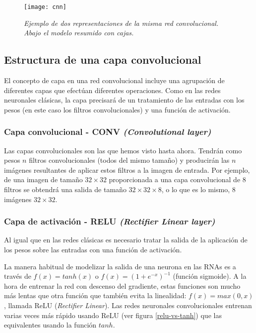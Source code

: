 \begin{figure}
    \centering
    \caption{\textit{Ejemplo de dos representaciones de la misma red convolucional. Abajo el modelo resumido con cajas.}}
  \label{cnn_basic}
  \texttt{[image: cnn]}
\end{figure}


\subsection{Estructura de una capa convolucional}

El concepto de capa en una red convolucional incluye una agrupación de diferentes capas que efectúan diferentes operaciones. Como en las redes neuronales clásicas, la capa precisará de un tratamiento de las entradas con los pesos (en este caso los filtros convolucionales) y una función de activación.

\subsubsection{Capa convolucional - CONV \textit{(Convolutional layer)}}

Las capas convolucionales son las que hemos visto hasta ahora. Tendrán como pesos $n$ filtros convolucionales (todos del mismo tamaño) y producirán las $n$ imágenes resultantes de aplicar estos filtros a la imagen de entrada. Por ejemplo, de una imagen de tamaño $32\times 32$ proporcionada a una capa convolucional de 8 filtros se obtendrá una salida de tamaño $32 \times 32 \times 8$, o lo que es lo mismo, 8 imágenes $32 \times 32$.

\subsubsection{Capa de activación - RELU \textit{(Rectifier Linear layer)}}
\label{sec:relu}

Al igual que en las redes clásicas es necesario tratar la salida de la aplicación de los pesos sobre las entradas con una función de activación. 

La manera habitual de modelizar la salida de una neurona en las RNAs es a través de $f(x) = tanh(x)$ o $f(x) = (1 + e^{-x})^{-1}$ (función sigmoide). A la hora de entrenar la red con descenso del gradiente, estas funciones son mucho más lentas que otra función que también evita la linealidad: $f(x) = max(0, x)$, llamada ReLU (\textit{Rectifier Linear}). Las redes neuronales convolucionales entrenan varias veces más rápido usando ReLU (ver figura \ref{relu-vs-tanh}) que las equivalentes usando la función $tanh$.

